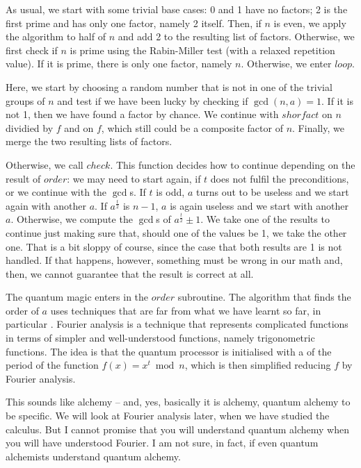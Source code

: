 \documentclass{scrreprt}
\newcommand{\Varid}[1]{\mathit{#1}}
\begin{document}
As usual, we start with some trivial base cases:
0 and 1 have no factors; 2 is the first prime
and has only one factor, namely 2 itself.
Then, if $n$ is even, we apply the algorithm
to half of $n$ and add 2 to the resulting list of factors.
Otherwise, we first check if $n$ is prime
using the Rabin-Miller test (with a relaxed repetition value).
If it is prime, there is only one factor, namely $n$.
Otherwise, we enter \ensuremath{\Varid{loop}}.

Here, we start by choosing a random number
that is not in one of the trivial groups of $n$
and test if we have been lucky 
by checking if $\gcd(n,a) = 1$.
If it is not 1, then we have found a factor by chance.
We continue with \ensuremath{\Varid{shorfact}} on 
$n$ dividied by $f$ and on $f$,
which still could be a composite factor of $n$.
Finally, we merge the two resulting lists
of factors.

Otherwise, we call \ensuremath{\Varid{check}}.
This function decides how to continue
depending on the result of \ensuremath{\Varid{order}}:
we may need to start again,
if $t$ does not fulfil the preconditions,
or we continue with the $\gcd$s.
If $t$ is odd, $a$ turns out to be useless
and we start again with another $a$.
If $a^{\frac{t}{2}}$ is $n-1$,
$a$ is again useless and we start with another $a$.
Otherwise, we compute the $\gcd$s of
$a^{\frac{t}{2}} \pm 1$. 
We take one of the results to continue
just making sure that, should one of the values be 1,
we take the other one.
That is a bit sloppy of course, since
the case that both results are 1 is not handled.
If that happens, however, something must be wrong 
in our math and, then, we cannot guarantee
that the result is correct at all.

The quantum magic enters in the \ensuremath{\Varid{order}} subroutine.
The algorithm that finds the order of $a$
uses techniques that are far from what we have
learnt so far, in particular .
Fourier analysis is a technique 
that represents complicated functions
in terms of simpler and well-understood functions,
namely trigonometric functions.
The idea is that the quantum processor
is initialised with a 
of the period of the function 
$f(x) = x^t \bmod{n}$,
which is then simplified reducing $f$ 
by Fourier analysis.

This sounds like alchemy -- and, yes,
basically it is alchemy,
quantum alchemy to be specific.
We will look at Fourier analysis later,
when we have studied the calculus.
But I cannot promise that you will understand
quantum alchemy when you will have understood Fourier.
I am not sure, in fact,
if even quantum alchemists 
understand quantum alchemy.
\end{document}

